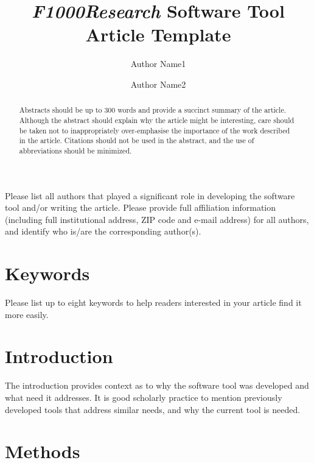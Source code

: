 \documentclass[9pt,a4paper]{extarticle}
\begin{document}
\pagestyle{front}

\title{\textit{F1000Research} Software Tool Article Template}
\author[1]{Author Name1}
\author[2]{Author Name2}

\maketitle
\thispagestyle{front}

Please list all authors that played a significant role in developing the software tool and/or writing the article. Please provide full affiliation information (including full institutional address, ZIP code and e-mail address) for all authors, and identify who is/are the corresponding author(s).

\begin{abstract}

Abstracts should be up to 300 words and provide a succinct summary of the article. Although the abstract should explain why the article might be interesting, care should be taken not to inappropriately over-emphasise the importance of the work described in the article. Citations should not be used in the abstract, and the use of abbreviations should be minimized.

\end{abstract}

\section*{Keywords}

Please list up to eight keywords to help readers interested in your article find it more easily.


\clearpage
\pagestyle{main}
\section*{Introduction}

The introduction provides context as to why the software tool was developed and what need it addresses.  It is good scholarly practice to mention previously developed tools that address similar needs, and why the current tool is needed. 

\section*{Methods}
\end{document}
